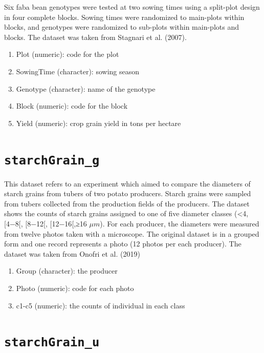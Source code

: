 \documentclass[
  letterpaper,
  DIV=11,
  numbers=noendperiod]{scrreprt}
\providecommand{\tightlist}{%
  \setlength{\itemsep}{0pt}\setlength{\parskip}{0pt}}
\begin{document}

Six faba bean genotypes were tested at two sowing times using a
split-plot design in four complete blocks. Sowing times were randomized
to main-plots within blocks, and genotypes were randomized to sub-plots
within main-plots and blocks. The dataset was taken from Stagnari et al.
(2007).

\begin{enumerate}
\def\labelenumi{\arabic{enumi}.}
\tightlist
\item
  Plot (numeric): code for the plot
\item
  SowingTime (character): sowing season
\item
  Genotype (character): name of the genotype
\item
  Block (numeric): code for the block
\item
  Yield (numeric): crop grain yield in tons per hectare
\end{enumerate}

\section*{\texorpdfstring{\texttt{starchGrain\_g}}{starchGrain\_g}}\label{StarchGrain_g}


This dataset refers to an experiment which aimed to compare the
diameters of starch grains from tubers of two potato producers. Starch
grains were sampled from tubers collected from the production fields of
the producers. The dataset shows the counts of starch grains assigned to
one of five diameter classes (\textless4, {[}4−8{[}, {[}8−12{[},
{[}12−16{[},≥16 \(\mu m\)). For each producer, the diameters were
measured from twelve photos taken with a microscope. The original
dataset is in a grouped form and one record represents a photo (12
photos per each producer). The dataset was taken from Onofri et al.
(2019)

\begin{enumerate}
\def\labelenumi{\arabic{enumi}.}
\tightlist
\item
  Group (character): the producer
\item
  Photo (numeric): code for each photo
\item
  c1-c5 (numeric): the counts of individual in each class
\end{enumerate}

\section*{\texorpdfstring{\texttt{starchGrain\_u}}{starchGrain\_u}}\label{StarchGrain_u}
\end{document}
